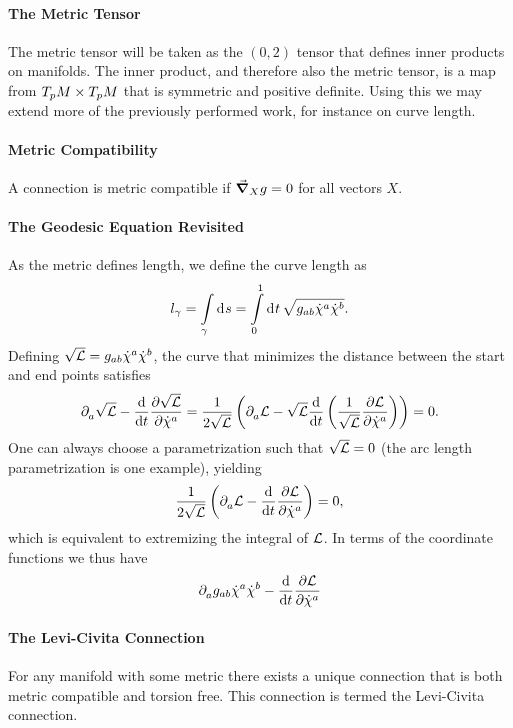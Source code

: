\paragraph{The Metric Tensor}
The metric tensor will be taken as the $(0, 2)$ tensor that defines inner products on manifolds. The inner product, and therefore also the metric tensor, is a map from $T_{p}M\times T_{p}M$ that is symmetric and positive definite. Using this we may extend more of the previously performed work, for instance on curve length.

\paragraph{Metric Compatibility}
A connection is metric compatible if $\grad_{X}{g} = 0$ for all vectors $X$.

\paragraph{The Geodesic Equation Revisited}
As the metric defines length, we define the curve length as
\begin{align*}
l_{\gamma} = \int\limits_{\gamma}^{}\dd[]{s} = \int\limits_{0}^{1}\dd[]{t}\sqrt{g_{ab}\dot{\chi}^{a}\dot{\chi}^{b}}.
\end{align*}
Defining $\sqrt{\mathcal{L}} = g_{ab}\dot{\chi}^{a}\dot{\chi}^{b}$, the curve that minimizes the distance between the start and end points satisfies
\begin{align*}
\partial^{}_{a}\sqrt{\mathcal{L}} - \dv{t}\pdv{\sqrt{\ensuremath{\mathcal{L}}}}{\dot{\chi}^{a}} = \frac{1}{2\sqrt{\mathcal{L}}}\left(\partial^{}_{a}\mathcal{L} - \sqrt{\mathcal{L}}\dv{t}\left(\frac{1}{\sqrt{\mathcal{L}}}\pdv{\ensuremath{\mathcal{L}}}{\dot{\chi}^{a}}\right)\right) = 0.
\end{align*}
One can always choose a parametrization such that $\sqrt{\mathcal{L}} = 0$ (the arc length parametrization is one example), yielding
\begin{align*}
\frac{1}{2\sqrt{\mathcal{L}}}\left(\partial^{}_{a}\mathcal{L} - \dv{t}\pdv{\ensuremath{\mathcal{L}}}{\dot{\chi}^{a}}\right) = 0,
\end{align*}
which is equivalent to extremizing the integral of $\mathcal{L}$. In terms of the coordinate functions we thus have
\begin{align*}
\partial^{}_{a}g_{ab}\dot{\chi}^{a}\dot{\chi}^{b} - \dv{t}\pdv{\ensuremath{\mathcal{L}}}{\dot{\chi}^{a}}
\end{align*}

\paragraph{The Levi-Civita Connection}
For any manifold with some metric there exists a unique connection that is both metric compatible and torsion free. This connection is termed the Levi-Civita connection.

